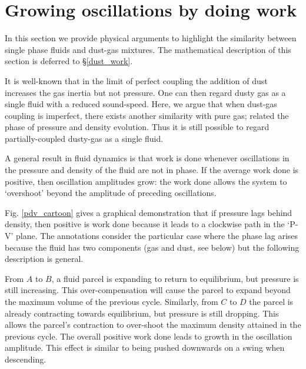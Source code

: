 \documentclass[iop, numberedappendix]{emulateapj}
\begin{document}
\section{Growing oscillations by doing work}\label{grow_osc}
{
In this section we provide physical arguments to highlight the
similarity between single phase fluids and dust-gas mixtures. The mathematical
description of this section is deferred to \S\ref{dust_work}. 

It is
well-known that in the limit of perfect coupling the addition of dust
increases the gas inertia but not pressure. One can then regard 
dusty gas as a single fluid with a reduced sound-speed. Here, we
argue that when dust-gas coupling is imperfect, there exists another
similarity with pure gas; related the phase of pressure and density
evolution. Thus it is still possible to regard
partially-coupled dusty-gas as a single fluid.  
}

A general result in fluid dynamics is that work is done whenever
oscillations in the pressure and density of the fluid are not in
phase. If  the average work done is positive, then oscillation
amplitudes grow: the work done allows the system to `overshoot' beyond 
the amplitude of preceding oscillations.   


Fig. \ref{pdv_cartoon} gives a graphical demonstration that 
if pressure lags behind density, then positive is work done 
because it leads to a clockwise path in the 
`P-V' plane. The annotations consider the particular case where the
phase lag arises because the fluid has two components (gas and dust,
see below) but the following description is general. 

From $A$ to $B$, a fluid parcel is expanding to return to 
equilibrium, but pressure is still 
increasing. This over-compensation will cause the parcel to expand
beyond the maximum volume of the previous cycle. 
Similarly, from $C$ to $D$ the parcel is already contracting towards
equilibrium, but pressure 
is still dropping. This allows the  
parcel's contraction to over-shoot the maximum density attained in the
previous cycle. 
The overall positive work done leads to growth in the oscillation amplitude. 
This effect is similar to being pushed downwards on a swing when 
descending.
\end{document}
